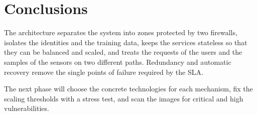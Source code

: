 \chapter{Conclusions}
\label{ch:conclusions}

The architecture separates the system into zones protected by two firewalls,
isolates the identities and the training data, keeps the services stateless so
that they can be balanced and scaled, and treats the requests of the users and
the samples of the sensors on two different paths. Redundancy and automatic
recovery remove the single points of failure required by the SLA.

The next phase will choose the concrete technologies for each mechanism, fix
the scaling thresholds with a stress test, and scan the images for critical
and high vulnerabilities.

